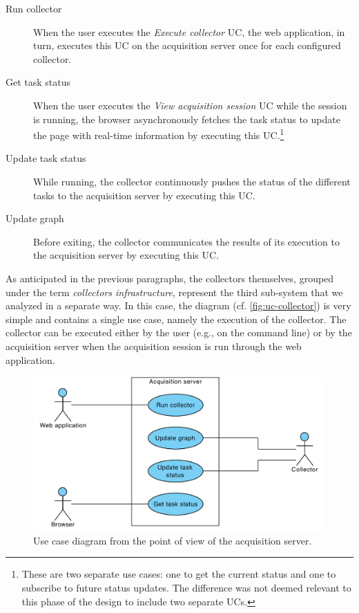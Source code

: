 \begin{description}
  \item[Run collector] When the user executes the \emph{Execute collector} UC, the web application, in turn, executes this UC on the acquisition server once for each configured collector.
  \item[Get task status] When the user executes the \emph{View acquisition session} UC while the session is running, the browser asynchronously fetches the task status to update the page with real-time information by executing this UC.\footnote{These are two separate use cases: one to get the current status and one to subscribe to future status updates. The difference was not deemed relevant to this phase of the design to include two separate UCs.}
  \item[Update task status] While running, the collector continuously pushes the status of the different tasks to the acquisition server by executing this UC.
  \item[Update graph] Before exiting, the collector communicates the results of its execution to the acquisition server by executing this UC.
\end{description}

As anticipated in the previous paragraphs, the collectors themselves, grouped under the term \emph{collectors infrastructure}, represent the third sub-system that we analyzed in a separate way. In this case, the diagram (cf. \vref{fig:uc-collector}) is very simple and contains a single use case, namely the execution of the collector. The collector can be executed either by the user (e.g., on the command line) or by the acquisition server when the acquisition session is run through the web application.

\begin{figure}[p]
  \centering
  \includegraphics[width=0.75\linewidth]{images/uc-server}
  \caption[Use case diagram for the acquisition server.]{Use case diagram from the point of view of the acquisition server.}
  \label{fig:uc-server}
\end{figure}

